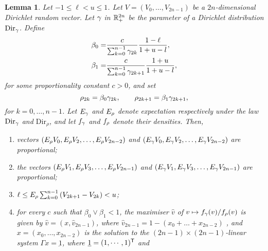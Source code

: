 \documentclass[10pt]{article}
\newtheorem{lemma}[thm]{Lemma}
\begin{document}
\begin{lemma}\label{lemma.proposal_dirparam}
 Let  $-1\leq \ell < u \leq 1$. Let $V=(V_0,\dots,V_{2n-1})$ be a $2n$-dimensional Dirichlet random vector. Let $\dirparam$ in $\R_{+}^{2n}$ be the parameter of a Dirichlet distribution $\text{Dir}_{\dirparam}$. Define
 \begin{equation*}
  \begin{split}
   \beta_0 = &
   \frac{c}{\sum_{k=0}^{n-1}\dirparam_{2k}}
   \frac{1-\ell}{1+u-l}, 
 \\
 \beta_1 = &
   \frac{c}{\sum_{k=0}^{n-1}\dirparam_{2k+1}}
   \frac{1+u}{1+u-l}, 
 \end{split}
 \end{equation*}
 for some proportionality constant $c>0$, and set 
 \begin{equation*}
  \rho_{2k} = \beta_0 \dirparam_{2k}, \qquad 
  \rho_{2k+1} = \beta_1 \dirparam_{2k+1}, 
 \end{equation*}
for $k=0,\dots,n-1$. Let $\Expectation_\dirparam$ and $\Expectation_\rho$ denote expectation respectively under the law $\text{Dir}_{\dirparam}$ and $\text{Dir}_{\rho}$, and let $\dirichletDensity[\dirparam]$ and $\dirichletDensity[\rho]$ denote their densities. Then,
\begin{enumerate}[label={\roman{*}.}, ref={\ref{lemma.proposal_dirparam}.\roman{*}}]
 \item \label{lemma.proposal_dirparam.proportional_even} vectors $(\Expectation_\rho V_{0}, \Expectation_\rho V_{2}, \dots , \Expectation_\rho V_{2n-2} )$ and $(\Expectation_\dirparam V_{0}, \Expectation_\dirparam V_{2}, \dots , \Expectation_\dirparam V_{2n-2} )$ are proportional;
 \item \label{lemma.proposal_dirparam.proportional_odd}the vectors $(\Expectation_\rho V_{1}, \Expectation_\rho V_{3}, \dots , \Expectation_\rho V_{2n-1} )$ and $(\Expectation_\dirparam V_{1}, \Expectation_\dirparam V_{3}, \dots , \Expectation_\dirparam V_{2n-1} )$ are proportional;
 \item  \label{lemma.proposal_dirparam.expectation} $\ell \leq \Expectation_{\rho} \sum_{k=0}^{n-1} \left( V_{2k+1} - V_{2k} \right) < u $;
 \item\label{lemma.proposal_dirparam.maximiser} for every $c$ such that $\beta_0 \vee \beta_1 < 1$, the maximiser $\hat{v}$ of $v\mapsto \dirichletDensity[\dirparam](v)/\dirichletDensity[\rho](v)$ is given by $\hat{v} = (x,\hat{v}_{2n-1})$, where $\hat{v}_{2n-1} = 1- (x_{0} + \dots + x_{2n-2})$ , and $x=(x_0,\dots,x_{2n-2})$ is the solution to the $(2n-1)\times(2n-1)$-linear system $\Gamma x = \underbar{1}$, where $\underbar{1} = (1,\cdots,1)\transpose$ and 

\end{enumerate}
\end{lemma}
\end{document}
